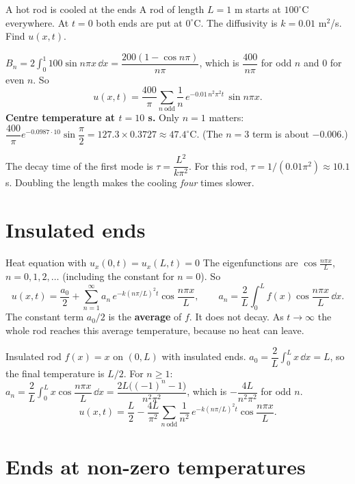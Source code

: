 \begin{examplebox}{A hot rod is cooled at the ends}
A rod of length $L=1$ m starts at $100^\circ$C everywhere. At $t=0$ both ends are put at $0^\circ$C. The diffusivity is $k=0.01$ m$^2$/s. Find $u(x,t)$.

$B_n = 2\displaystyle\int_0^1 100\sin n\pi x\,\dd x = \dfrac{200(1-\cos n\pi)}{n\pi}$, which is $\dfrac{400}{n\pi}$ for odd $n$ and $0$ for even $n$. So
\[ u(x,t) = \frac{400}{\pi}\sum_{n\ \text{odd}}\frac{1}{n}\,e^{-0.01\,n^2\pi^2t}\,\sin n\pi x. \]
\textbf{Centre temperature at $t=10$ s.} Only $n=1$ matters: $\dfrac{400}{\pi}e^{-0.0987\cdot 10}\sin\dfrac\pi2 = 127.3\times 0.3727 \approx 47.4^\circ$C. (The $n=3$ term is about $-0.006$.)
\end{examplebox}

\begin{notebox}
The decay time of the first mode is $\tau = \dfrac{L^2}{k\pi^2}$. For this rod, $\tau = 1/(0.01\pi^2) \approx 10.1$ s. Doubling the length makes the cooling \emph{four} times slower.
\end{notebox}

\section{Insulated ends}

\begin{methodbox}{Heat equation with $u_x(0,t)=u_x(L,t)=0$}
The eigenfunctions are $\cos\frac{n\pi x}{L}$, $n = 0,1,2,\dots$ (including the constant for $n=0$). So
\[ u(x,t) = \frac{a_0}{2} + \sum_{n=1}^\infty a_n\,e^{-k(n\pi/L)^2t}\cos\frac{n\pi x}{L},\qquad a_n = \frac2L\int_0^Lf(x)\cos\frac{n\pi x}{L}\,\dd x. \]
The constant term $a_0/2$ is the \textbf{average} of $f$. It does not decay. As $t\to\infty$ the whole rod reaches this average temperature, because no heat can leave.
\end{methodbox}

\begin{examplebox}{Insulated rod}
$f(x)=x$ on $(0,L)$ with insulated ends. $a_0 = \dfrac2L\displaystyle\int_0^Lx\,\dd x = L$, so the final temperature is $L/2$. For $n\ge1$: $a_n = \dfrac2L\int_0^Lx\cos\dfrac{n\pi x}{L}\,\dd x = \dfrac{2L\big((-1)^n-1\big)}{n^2\pi^2}$, which is $-\dfrac{4L}{n^2\pi^2}$ for odd $n$.
\[ u(x,t) = \frac L2 - \frac{4L}{\pi^2}\sum_{n\ \text{odd}}\frac{1}{n^2}\,e^{-k(n\pi/L)^2t}\cos\frac{n\pi x}{L}. \]
\end{examplebox}

\section{Ends at non-zero temperatures}

